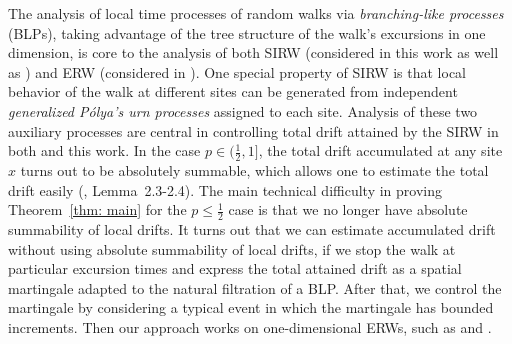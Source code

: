 \documentclass[twoside,12pt, a4paper]{article}
\numberwithin{equation}{section}
\theoremstyle{remark}
\newcommand\TBD{\textcolor{red}{TBD.}}
\begin{document}
	
	The analysis of local time processes of random walks via \textit{branching-like processes} (BLPs), taking advantage of the tree structure of the walk's excursions in one dimension, is core to the analysis of both SIRW (considered in this work as well as \cite{T96, KMP23}) and ERW (considered in \cite{DK12, KP16, KMP22}). 
	One special property of SIRW is that local behavior of the walk at different sites can be generated from independent \textit{generalized P\'olya's urn processes} assigned to each site.
	Analysis of these two auxiliary processes are central in controlling total drift attained by the SIRW in both \cite{KMP23} and this work.
	In the case $p \in (\frac{1}{2}, 1]$, the total drift accumulated at any site $x$ turns out to be absolutely summable, which allows one to estimate the total drift easily (\cite{KMP23}, Lemma~2.3-2.4).
	The main technical difficulty in proving Theorem~\ref{thm: main} for the $p \le \frac{1}{2}$ case is that we no longer have absolute summability of local drifts.
	It turns out that we can estimate accumulated drift without using absolute summability of local drifts, if we stop the walk at particular excursion times and express the total attained drift as a spatial martingale adapted to the natural filtration of a BLP. After that, we control the martingale by considering a typical event in which the martingale has bounded increments.
	Then our approach works on one-dimensional ERWs, such as \cite{DK12} and \cite{KP16}.
	
	
	
\end{document}
